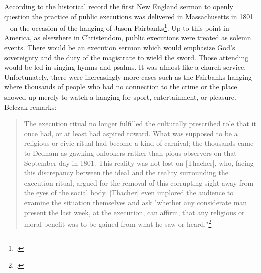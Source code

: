 According to the historical record the first New England sermon to openly question the practice of public executions was delivered in Massachusetts in 1801 -- on the occasion of the hanging of Jason Fairbanks\footcite[The main thrust of Belczak's dissertation is that the \textit{liberalizing} of Christianity in New England led to the shift away from executions being open to the general public. I believe that conservatives \textit{and} liberals were able to unite on getting rid of the \textit{spectacle} aspect.  The liberals pressed forward from this and worked effectively to abolish the death penalty entirely where it was in their power so to do.]{belczakchanging}.  Up to this point in America, as elsewhere in Christendom, public executions were treated as solemn events.  There would be an execution sermon which would emphasize God's sovereignty and the duty of the magistrate to wield the sword.  Those attending would be led in singing hymns and psalms.  It was almost like a church service.  Unfortunately, there were increasingly more cases such as the Fairbanks hanging where thousands of people who had no connection to the crime or the place showed up merely to watch a hanging for sport, entertainment, or pleasure. Belczak remarks:
\begin{quote}
The execution ritual no longer fulfilled the culturally prescribed role that it once had, or at least had aspired toward.  What was supposed to be a religious or civic ritual had become a kind of carnival; the thousands came to Dedham as gawking onlookers rather than pious observers on that September day in 1801.  This reality was not lost on [Thacher], who, facing this discrepancy between the ideal and the reality surrounding the execution ritual, argued for the removal of this corrupting sight away from the eyes of the social body.  [Thacher] even implored the audience to examine the situation themselves and ask "whether any considerate man present the last week, at the execution, can affirm, that any religious or moral benefit was to be gained from what he saw or heard."\footcite{belczakchanging}
\end{quote} 

